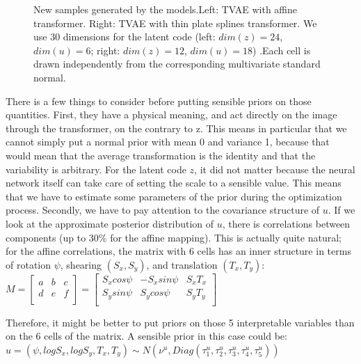 \documentclass[letterpaper, twoside]{article}
\begin{document}
\begin{figure}[h]
\begin{minipage}{.5\textwidth}
\begin{tabular}{|@{}c@{}|}
\end{tabular}
\end{minipage}%
\caption{New samples generated by the models.Left: TVAE with affine transformer. Right: TVAE with thin plate splines transformer. We use 30 dimensions for the latent code (left: $dim(z) = 24$, $dim(u) = 6$; right: $dim(z) = 12$, $dim(u) = 18$) .Each cell is drawn independently from the corresponding multivariate standard normal.}
\label{generatedafftps}
\end{figure}

There is a few things to consider before putting sensible priors on those quantities. First, they have a physical meaning, and act directly on the image through the transformer, on the contrary to z. This means in particular that we cannot simply put a normal prior with mean 0 and variance 1, because that would mean that the average transformation is the identity and that the variability is arbitrary. For the latent code $z$, it did not matter because the neural network itself can take care of setting the scale to a sensible value. This means that we have to estimate some parameters of the prior during the optimization process. Secondly, we have to pay attention to the covariance structure of $u$. If we look at the approximate posterior distribution of $u$, there is correlations between components (up to 30\% for the affine mapping). This is actually quite natural; for the affine correlations, the matrix with 6 cells has an inner structure in terms of rotation $\psi$, shearing $(S_x, S_y)$, and translation $(T_x, T_y)$:\\

$M=
  \left[ {\begin{array}{ccc}
   a & b & c\\
   d & e & f\\
  \end{array} } \right]
 = 
  \left[ {\begin{array}{ccc}
   S_x cos \psi & -S_x sin \psi & S_x T_x\\
   S_y sin \psi & S_y cos \psi & S_y T_y\\
  \end{array} } \right]$

  Therefore, it might be better to put priors on those 5 interpretable variables than on the 6 cells of the matrix. A sensible prior in this case could be:\\
  $u = (\psi, log S_x, log S_y, T_x, T_y) \sim N(\nu^u, Diag(\tau_1^u, \tau_2^u, \tau_3^u, \tau_4^u, \tau_5^u))$
\end{document}
